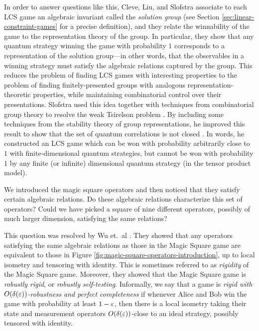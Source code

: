 In order to answer questions like this, Cleve, Liu, and Slofstra \cite{cleve2016perfect} associate to each LCS game an algebraic invariant called the \emph{solution group} (see Section \ref{sec:linear-constraint-games} for a precise definition), and they relate the winnability of the game to the representation theory of the group. In particular, they show that any quantum strategy winning the game with probability $1$ corresponds to a representation of the solution group---in other words, that the observables in a winning strategy must satisfy the algebraic relations captured by the group. This reduces the problem of finding LCS games with interesting properties to the problem of finding finitely-presented groups with analogous representation-theoretic properties, while maintaining combinatorial control over their presentations. Slofstra used this idea together with techniques from combinatorial group theory to resolve the weak Tsirelson problem \cite{slofstra2016tsirelson}. By including some techniques from the stability theory of group representations, he improved this result to show that the set of quantum correlations is not closed \cite{slofstra2017set}. In words, he constructed an LCS game which can be won with probability arbitrarily close to $1$ with finite-dimensional quantum strategies, but cannot be won with probability $1$ by any finite (or infinite) dimensional quantum strategy (in the tensor product model).


\begin{question}\label{question:is-magic-square-game-rigid}
	We introduced the magic square operators and then noticed that they satisfy certain algebraic relations. Do these algebraic relations characterize this set of operators? Could we have picked a square of nine different operators, possibly of much larger dimension, satisfying the same relations?
\end{question}

This question was resolved by Wu et.\ al \cite{wu2016device}. They showed that any operators satisfying the same algebraic relations as those in the Magic Square game are equivalent to those in Figure \ref{fig:magic-square-operators-introduction}, up to local isometry and tensoring with identity. This is sometimes referred to as \emph{rigidity} of the Magic Square game. Moreover, they showed that the Magic Square game is \emph{robustly rigid}, or \emph{robustly self-testing}. Informally, we say that a game is \emph{rigid with $O(\delta(\varepsilon))$-robustness and perfect completeness} if whenever Alice and Bob win the game with probability at least $1-\varepsilon$, then there is a local isometry taking their state and measurement operators $O(\delta(\varepsilon))$-close to an ideal strategy, possibly tensored with identity.

